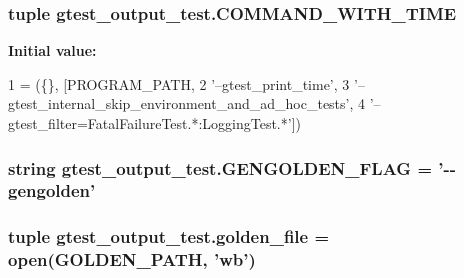 \hypertarget{namespacegtest__output__test_a1c27d93a57990d21461436f2d5ff3064}{
\subsubsection[{C\-O\-M\-M\-A\-N\-D\-\_\-\-W\-I\-T\-H\-\_\-\-T\-I\-M\-E}]{\setlength{\rightskip}{0pt plus 5cm}tuple gtest\-\_\-output\-\_\-test.\-C\-O\-M\-M\-A\-N\-D\-\_\-\-W\-I\-T\-H\-\_\-\-T\-I\-M\-E}}\label{namespacegtest__output__test_a1c27d93a57990d21461436f2d5ff3064}
{\bfseries Initial value\-:}
\begin{DoxyCode}
1 = (\{\}, [PROGRAM\_PATH,
2                           \textcolor{stringliteral}{'--gtest\_print\_time'},
3                           \textcolor{stringliteral}{'--gtest\_internal\_skip\_environment\_and\_ad\_hoc\_tests'},
4                           \textcolor{stringliteral}{'--gtest\_filter=FatalFailureTest.*:LoggingTest.*'}])
\end{DoxyCode}
\hypertarget{namespacegtest__output__test_a25addad68fc28461f31e7f473bb7643f}{
\subsubsection[{G\-E\-N\-G\-O\-L\-D\-E\-N\-\_\-\-F\-L\-A\-G}]{\setlength{\rightskip}{0pt plus 5cm}string gtest\-\_\-output\-\_\-test.\-G\-E\-N\-G\-O\-L\-D\-E\-N\-\_\-\-F\-L\-A\-G = '-\/-\/gengolden'}}\label{namespacegtest__output__test_a25addad68fc28461f31e7f473bb7643f}
\hypertarget{namespacegtest__output__test_ae163d7a6ccbd6e49abe6982a89c3bca9}{
\subsubsection[{golden\-\_\-file}]{\setlength{\rightskip}{0pt plus 5cm}tuple gtest\-\_\-output\-\_\-test.\-golden\-\_\-file = open({\bf G\-O\-L\-D\-E\-N\-\_\-\-P\-A\-T\-H}, 'wb')}}\label{namespacegtest__output__test_ae163d7a6ccbd6e49abe6982a89c3bca9}
